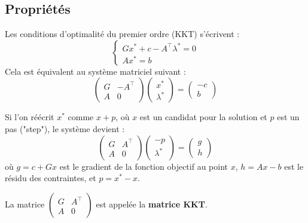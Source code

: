 \subsection{Propriétés}

Les conditions d'optimalité du premier ordre (KKT) s'écrivent :
\begin{equation}
    \begin{cases}
        G x^* + c - A^\top \lambda^* = 0 \\
        A x^* = b
    \end{cases}
\end{equation}
Cela est équivalent au système matriciel suivant :
\begin{equation}
    \begin{pmatrix}
        G & -A^\top \\
        A & 0
    \end{pmatrix}
    \begin{pmatrix}
        x^* \\
        \lambda^*
    \end{pmatrix}
    =
    \begin{pmatrix}
        -c \\
        b
    \end{pmatrix}
\end{equation}

\begin{remarque}
    Si l'on réécrit $x^*$ comme $x + p$, où $x$ est un candidat pour la solution et $p$ est un pas ("step"), le système devient :
    \begin{equation}
        \begin{pmatrix}
            G & A^\top \\
            A & 0
        \end{pmatrix}
        \begin{pmatrix}
            -p \\
            \lambda^*
        \end{pmatrix}
        =
        \begin{pmatrix}
            g \\
            h
        \end{pmatrix}
    \end{equation}
    où $g = c + Gx$ est le gradient de la fonction objectif au point $x$, $h = Ax - b$ est le résidu des contraintes, et $p = x^* - x$.
    
    La matrice $\begin{pmatrix} G & A^\top \\ A & 0 \end{pmatrix}$ est appelée la \textbf{matrice KKT}.
\end{remarque}

